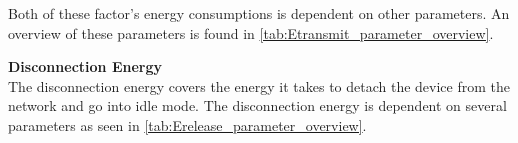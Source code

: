 Both of these factor's energy consumptions is dependent on other parameters. An overview of these parameters is found in \autoref{tab:Etransmit_parameter_overview}.

\begin{table}[H]
\centering
{}
\caption{Paremeter overview for each term in the transmit energy calculation.}
\label{tab:Etransmit_parameter_overview}
\end{table}


\textbf{Disconnection Energy}\\
The disconnection energy covers the energy it takes to detach the device from the network and go into idle mode. The disconnection energy is dependent on several parameters as seen in \autoref{tab:Erelease_parameter_overview}.


